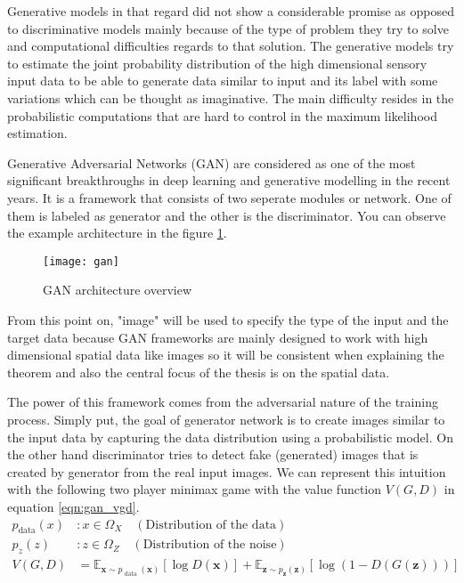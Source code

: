 Generative models in that regard did not show a considerable promise as opposed to discriminative
models mainly because of the type of problem they try to solve and computational difficulties
regards to that solution. The generative models try to estimate the joint probability distribution
of the high dimensional sensory input data to be able to generate data similar to input and its
label with some variations which can be thought as imaginative. The main difficulty resides in
the probabilistic computations that are hard to control in the maximum likelihood estimation.
\cite{Goodfellow:2014:GAN:2969033.2969125} \cite{pmlr-v5-salakhutdinov09a}

Generative Adversarial Networks (GAN) are considered as one of the most significant breakthroughs in
deep learning and generative modelling in the recent years. It is a framework that consists of two
seperate modules or network. One of them is labeled as generator and the other is the discriminator. You can
observe the example architecture in the figure \ref{fig:gan_network}. 

\begin{figure}[h!]
	\centering
	\texttt{[image: gan]}
    \caption{GAN architecture overview}
    \label{fig:gan_network}
\end{figure}

From this point on, "image" will be used to specify the type of the input and the target data because
GAN frameworks are mainly designed to work with high dimensional spatial data like images so it will
be consistent when explaining the theorem and also the central focus of the thesis is on the spatial
data. 

The power of this framework comes from the adversarial nature of the training process. Simply put,
the goal of generator network is to create images similar to the input data by capturing the
data distribution using a probabilistic model. On the other hand discriminator tries to detect fake
(generated) images that is created by generator from the real input images. We can represent this
intuition with the following two player minimax game with the value function $V(G,D)$ in equation \ref{eqn:gan_vgd}.
\cite{Goodfellow:2014:GAN:2969033.2969125}
\begin{align}
    p_{\text{data}} (x) & : x \in \Omega_{X} \quad (\text{Distribution of the data})\\[5pt]
    p_z (z) & : z \in \Omega_{Z} \quad (\text{Distribution of the noise}) \\[5pt]
    \label{eqn:gan_vgd}
    V(G, D) &= \mathbb{E}_{\boldsymbol{x} \sim p_{\text { data }}(\boldsymbol{x})}[\log D(\boldsymbol{x})]+\mathbb{E}_{\boldsymbol{z} \sim p_{\boldsymbol{z}}(\boldsymbol{z})}[\log (1-D(G(\boldsymbol{z})))]
\end{align}

